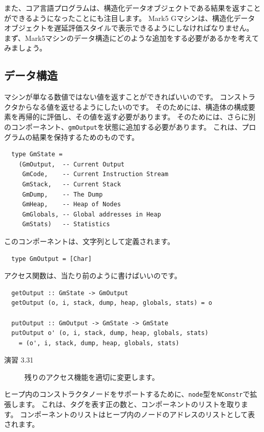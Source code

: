 \documentclass{jbook}
\begin{document}
また、コア言語プログラムは、構造化データオブジェクトである結果を返すことができるようになったことにも注目します。
Mark5 Gマシンは、構造化データオブジェクトを遅延評価スタイルで表示できるようにしなければなりません。
まず、Mark5マシンのデータ構造にどのような追加をする必要があるかを考えてみましょう。

\subsection{データ構造}

マシンが単なる数値ではない値を返すことができればいいのです。
コンストラクタからなる値を返せるようにしたいのです。
そのためには、構造体の構成要素を再帰的に評価し、その値を返す必要があります。
そのためには、さらに別のコンポーネント、\texttt{gmOutput}を状態に追加する必要があります。
これは、プログラムの結果を保持するためのものです。

\begin{verbatim}
  type GmState =
    (GmOutput,  -- Current Output
     GmCode,    -- Current Instruction Stream
     GmStack,   -- Current Stack
     GmDump,    -- The Dump
     GmHeap,    -- Heap of Nodes
     GmGlobals, -- Global addresses in Heap
     GmStats)   -- Statistics
\end{verbatim}

このコンポーネントは、文字列として定義されます。

\begin{verbatim}
  type GmOutput = [Char]
\end{verbatim}

アクセス関数は、当たり前のように書けばいいのです。

\begin{verbatim}
  getOutput :: GmState -> GmOutput
  getOutput (o, i, stack, dump, heap, globals, stats) = o

  putOutput :: GmOutput -> GmState -> GmState
  putOutput o' (o, i, stack, dump, heap, globals, stats)
    = (o', i, stack, dump, heap, globals, stats)
\end{verbatim}

\begin{description}
	\item[演習 3.31] 残りのアクセス機能を適切に変更します。
\end{description}

ヒープ内のコンストラクタノードをサポートするために、\texttt{node}型を\texttt{NConstr}で拡張します。
これは、タグを表す正の数と、コンポーネントのリストを取ります。
コンポーネントのリストはヒープ内のノードのアドレスのリストとして表されます。
\end{document}
